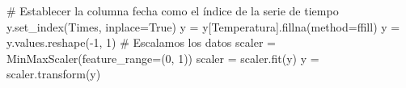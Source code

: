 \documentclass[
  us-letterpaper,
]{scrreprt}
\newenvironment{Shaded}{\begin{snugshade}}{\end{snugshade}}
\newcommand{\CommentTok}[1]{\textcolor[rgb]{0.37,0.37,0.37}{#1}}
\newcommand{\DecValTok}[1]{\textcolor[rgb]{0.68,0.00,0.00}{#1}}
\newcommand{\NormalTok}[1]{\textcolor[rgb]{0.00,0.23,0.31}{#1}}
\newcommand{\OperatorTok}[1]{\textcolor[rgb]{0.37,0.37,0.37}{#1}}
\newcommand{\StringTok}[1]{\textcolor[rgb]{0.13,0.47,0.30}{#1}}
\newcommand{\VariableTok}[1]{\textcolor[rgb]{0.07,0.07,0.07}{#1}}
\theoremstyle{plain}
\theoremstyle{definition}
\theoremstyle{definition}
\theoremstyle{remark}
\begin{document}
\begin{Shaded}
\begin{Highlighting}[]
\CommentTok{\# Establecer la columna \textquotesingle{}fecha\textquotesingle{} como el índice de la serie de tiempo}
\NormalTok{y.set\_index(}\StringTok{\textquotesingle{}Times\textquotesingle{}}\NormalTok{, inplace}\OperatorTok{=}\VariableTok{True}\NormalTok{)}
\NormalTok{y }\OperatorTok{=}\NormalTok{ y[}\StringTok{\textquotesingle{}Temperatura\textquotesingle{}}\NormalTok{].fillna(method}\OperatorTok{=}\StringTok{\textquotesingle{}ffill\textquotesingle{}}\NormalTok{)}
\NormalTok{y }\OperatorTok{=}\NormalTok{ y.values.reshape(}\OperatorTok{{-}}\DecValTok{1}\NormalTok{, }\DecValTok{1}\NormalTok{)}
\CommentTok{\# Escalamos los datos}
\NormalTok{scaler }\OperatorTok{=}\NormalTok{ MinMaxScaler(feature\_range}\OperatorTok{=}\NormalTok{(}\DecValTok{0}\NormalTok{, }\DecValTok{1}\NormalTok{))}
\NormalTok{scaler }\OperatorTok{=}\NormalTok{ scaler.fit(y)}
\NormalTok{y }\OperatorTok{=}\NormalTok{ scaler.transform(y)}
\end{Highlighting}
\end{Shaded}
\end{document}
